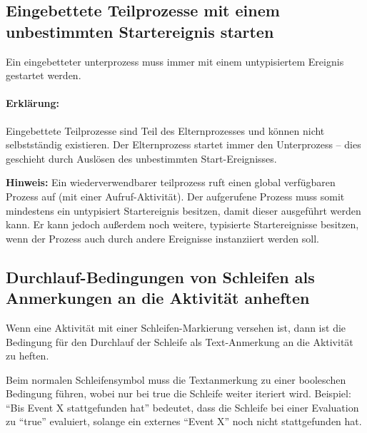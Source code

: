 \documentclass[12pt,report]{snetTeaching}
\begin{document}
\begin{Rahmen}
	\hfill
\end{Rahmen}

\pagebreak
\subsection{Eingebettete Teilprozesse mit einem unbestimmten Startereignis starten}

Ein eingebetteter \Gls{unterprozess} muss immer mit einem untypisiertem Ereignis gestartet werden. 

\begin{Rahmen}
	\hfill
\end{Rahmen}

\paragraph{Erklärung:} Eingebettete Teilprozesse sind Teil des Elternprozesses und können nicht selbstständig existieren. Der Elternprozess startet immer den Unterprozess -- dies geschieht durch Auslösen des unbestimmten Start-Ereignisses.

\textbf{Hinweis:} Ein wiederverwendbarer \gls{teilprozess} ruft einen global verfügbaren Prozess auf (mit einer Aufruf-Aktivität). Der aufgerufene Prozess muss somit mindestens ein \gls{untypisiert} Startereignis besitzen, damit dieser ausgeführt werden kann. Er kann jedoch außerdem noch weitere, typisierte Startereignisse besitzen, wenn der Prozess auch durch andere Ereignisse instanziiert werden soll.


\subsection{Durchlauf-Bedingungen von Schleifen als Anmerkungen an die Aktivität anheften}

Wenn eine Aktivität mit einer Schleifen-Markierung versehen ist, dann ist die Bedingung für den Durchlauf der Schleife als Text-Anmerkung an die Aktivität zu heften. 

Beim normalen Schleifensymbol muss die Textanmerkung zu einer booleschen Bedingung führen, wobei nur bei true die Schleife weiter iteriert wird. Beispiel: "`Bis Event X stattgefunden hat"' bedeutet, dass die Schleife bei einer Evaluation zu "`true"' evaluiert, solange ein externes "`Event X"' noch nicht stattgefunden hat.
\end{document}
